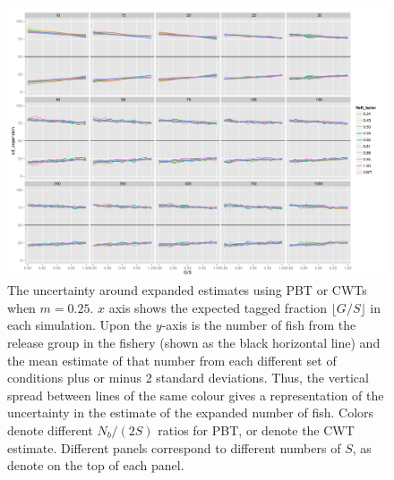 \documentclass[11pt]{article}
\begin{document}
\begin{figure}
\includegraphics[width = .93\textwidth]{./images/sd_line_horns_m_0_25.pdf}
\caption{The uncertainty around expanded estimates using PBT or CWTs when $m = 0.25$.  $x$ axis shows the
expected tagged fraction $\lfloor G/S \rfloor$ in each simulation. Upon the $y$-axis is the number of fish from the
release group in the fishery (shown as the black horizontal line) and the mean estimate of that number from each different set of 
conditions plus or minus 2 standard deviations.  Thus, the vertical spread between lines of the same colour gives a representation
of the uncertainty in the estimate of the expanded number of fish. Colors denote different $N_b/(2S)$ ratios for PBT, or denote
the CWT estimate.  Different
panels correspond to different numbers of $S$, as denote on the top of each panel.
\label{fig:all_sds}}
\end{figure}
\end{document}
